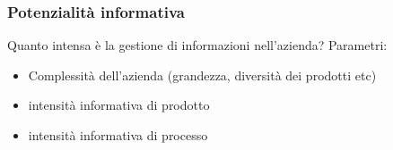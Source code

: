 \subsubsection{Potenzialit\`a informativa}
Quanto intensa \`e la gestione di informazioni nell'azienda?
Parametri:
\begin{itemize}
  \item Complessit\`a dell'azienda (grandezza, diversit\`a dei prodotti etc)
  \item intensit\`a informativa di prodotto
  \item intensit\`a informativa di processo
\end{itemize}
